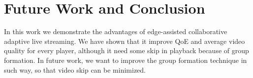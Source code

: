 \section{Future Work and Conclusion}
In this work we demonstrate the advantages of edge-assisted collaborative adaptive live streaming. We have shown that it improve QoE and average video quality for every player, although it need some skip in playback because of group formation. In future work, we want to improve the group formation technique in such way, so that video skip can be minimized.